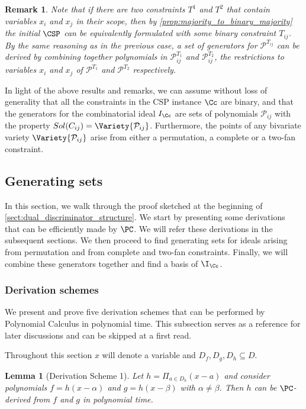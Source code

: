 \documentclass[11pt]{article}
\newtheorem{lemma}[theorem]{Lemma}
\newtheorem{remark}[theorem]{Remark}
\begin{document}
\begin{remark}
    Note that if there are two constraints $T^1$ and $T^2$ that contain variables $x_i$ and $x_j$ in their scope, then by \cref{prop:majority_to_binary_majority} the initial $\CSP$ can be equivalently formulated with some binary constraint $T_{ij}$. By the same reasoning as in the previous case, a set of generators for $\mathcal{P}^{T_{ij}}$ can be derived by combining together polynomials in $\mathcal{P}^{T_1}_{ij}$ and $\mathcal{P}^{T_2}_{ij}$, the restrictions to variables $x_i$ and $x_j$ of $\mathcal{P}^{T_1}$ and $\mathcal{P}^{T_2}$ respectively.
\end{remark}

In light of the above results and remarks, we can assume without loss of generality that all the constraints in the CSP instance $\Cc$ are binary, and that the generators for the combinatorial ideal $I_{\Cc}$ are sets of polynomials $\mathcal{P}_{ij}$ with the property $Sol(C_{ij}) = \Variety{\mathcal{P}_{ij}}$. Furthermore, the points of any bivariate variety $\Variety{\mathcal{P}_{ij}}$ arise from either a permutation, a complete or a two-fan constraint.

\subsection{Generating sets}

In this section, we walk through the proof sketched at the beginning of \cref{sect:dual_discriminator_structure}. We start by presenting some derivations that can be efficiently made by $\PC$. We will refer these derivations in the subsequent sections. We then proceed to find generating sets for ideals arising from permutation and from complete and two-fan constraints. Finally, we will combine these generators together and find a \GB basis of $\I_{\Cc}$.

\subsubsection{Derivation schemes}

We present and prove five derivation schemes that can be performed by Polynomial Calculus in polynomial time. This subsection serves as a reference for later discussions and can be skipped at a first read.

Throughout this section $x$ will denote a variable and $D_f, D_g, D_h \subseteq D$.

\begin{lemma}[Derivation Scheme 1]\label{th:derivation_scheme_1}
    Let $h = \Pi_{a \in D_h}(x-a)$ and consider polynomials $f = h(x-\alpha)$ and $g = h(x-\beta)$ with $\alpha \neq \beta$. Then $h$ can be $\PC$-derived from $f$ and $g$ in polynomial time.
\end{lemma}
\end{document}
